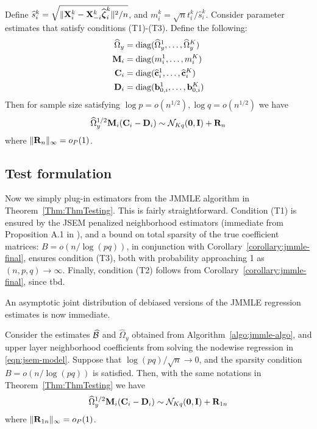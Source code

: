 \begin{Theorem}\label{Thm:ThmTesting}
Define $\widehat s_i^k = \sqrt{\| {\mathbf{X}}_i^k - {\mathbf{X}}_{-i}^k \widehat {{\boldsymbol{\zeta}}}_i^k \|^2/n}$, and $m_i^k = \sqrt n t_i^k / \widehat s_i^k$. Consider parameter estimates that satisfy conditions (T1)-(T3). Define the following:
%
\begin{align*}
\widehat \Omega_y &= \operatorname*{diag}(\widehat \Omega_y^1, \ldots, \widehat \Omega_y^K)\\
{\mathbf{M}}_i &= \operatorname*{diag}(m_i^1, \ldots, m_i^K)\\
{\mathbf{C}}_i &= \operatorname*{diag}(\widehat {{\bf{c}}}_i^1, \ldots, \widehat {{\bf{c}}}_i^K)\\
{\mathbf{D}}_i &= \operatorname*{diag}({\bf{b}}_{0,i}^1, \ldots, {\bf{b}}_{0,i}^K)\\
\end{align*}
%
Then for sample size satisfying $\log p = o(n^{1/2}), \log q = o(n^{1/2})$ we have
%
\begin{align}\label{eqn:ThmTestingEqn}
\widehat \Omega_y^{1/2} {\mathbf{M}}_i ({\mathbf{C}}_i - {\mathbf{D}}_i) \sim
{\cal{N}}_{Kq} ({\bf 0}, {\mathbf{I}}) + {\mathbf{R}}_n
\end{align}
%
where $\| {\mathbf{R}}_n \|_\infty = o_P(1)$.
\end{Theorem}
%

\subsection{Test formulation}
\label{sec:testing-subsec-2}
Now we simply plug-in estimators from the JMMLE algorithm in Theorem~\ref{Thm:ThmTesting}. This is fairly straightforward. Condition (T1) is ensured by the JSEM penalized neighborhood estimators (immediate from Proposition A.1 in \cite{MaMichailidis15}), and a bound on total sparsity of the true coefficient matrices: $B = o(n/ \log(pq))$, in conjunction with Corollary~\ref{corollary:jmmle-final}, ensures condition (T3), both with probability approaching 1 as $(n,p,q) \rightarrow \infty$. Finally, condition (T2) follows from Corollary~\ref{corollary:jmmle-final}, since {\colrbf tbd}.

An asymptotic joint distribution of debiased versions of the JMMLE regression estimates is now immediate.
%
\begin{Corollary}\label{corollary:CorTesting}
Consider the estimates $\widehat {{\cal{B}}}$ and $\widehat \Omega_y $ obtained from Algorithm~\ref{algo:jmmle-algo}, and upper layer neighborhood coefficients from solving the nodewise regression in \eqref{eqn:jsem-model}. Suppose that $\log (pq) /\sqrt n \rightarrow 0$, and the sparsity condition $B = o(n / \log(pq))$ is satisfied. Then, with the same notations in Theorem~\ref{Thm:ThmTesting} we have
%
\begin{align}\label{eqn:CorTestingEqn}
\widehat \Omega_y^{1/2} {\mathbf{M}}_i ({\mathbf{C}}_i - {\mathbf{D}}_i) \sim
{\cal{N}}_{Kq} ({\bf 0}, {\mathbf{I}}) + {\mathbf{R}}_{1n}
\end{align}
%
where $\| {\mathbf{R}}_{1n} \|_\infty = o_P(1)$.
\end{Corollary}

